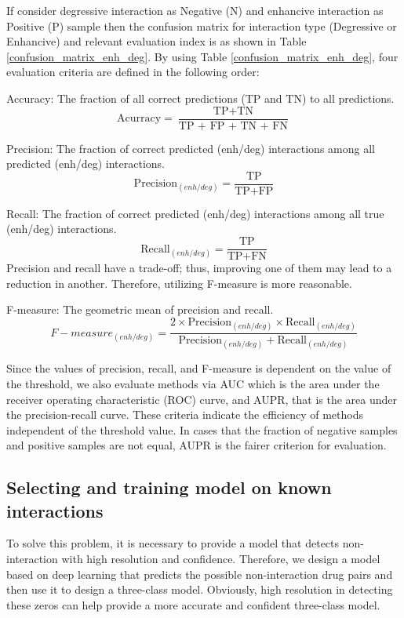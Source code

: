 \documentclass{bmcart}
\begin{document}
If consider degressive interaction as Negative (N) and enhancive interaction as Positive (P) sample then the confusion matrix for interaction type (Degressive or Enhancive) and relevant evaluation index is as shown in Table \ref{confusion_matrix_enh_deg}. By using Table \ref{confusion_matrix_enh_deg}, four evaluation criteria are defined in the following order:

Accuracy: The fraction of all correct predictions (TP and TN) to all predictions.
$$ \mbox{Acurracy} =  \frac{ \mbox{TP} + \mbox{TN}}{\mbox{TP + FP + TN + FN}} $$

Precision: The fraction of correct predicted (enh/deg) interactions among all predicted (enh/deg) interactions.
$$ \mbox{Precision}_{(enh/deg)} =  \frac{\mbox{TP}}{\mbox{TP} + \mbox{FP}} $$

Recall: The fraction of correct predicted (enh/deg) interactions among all true (enh/deg) interactions.
$$ \mbox{Recall}_{(enh/deg)} =  \frac{ \mbox{TP}}{\mbox{TP} + \mbox{FN}} $$
Precision and recall have a trade-off; thus, improving one of them may lead to a reduction in another. Therefore, utilizing F-measure is more reasonable.

F-measure: The geometric mean of precision and recall.
$$ F-measure_{(enh/deg)} = \frac{ 2\times \mbox{Precision}_{(enh/deg)} \times \mbox{Recall}_{(enh/deg)}}{\mbox{Precision}_{(enh/deg)} + \mbox{Recall}_{(enh/deg)}} $$

Since the values of precision, recall, and F-measure is dependent on the value of the threshold, we also evaluate methods via AUC which is the area under the receiver operating characteristic (ROC) curve, and AUPR, that is the area under the precision-recall curve. These criteria indicate the efficiency of methods independent of the threshold value. In cases that the fraction of negative samples and positive samples are not equal, AUPR is the fairer criterion for evaluation.

\subsection*{Selecting and training model on known interactions}
To solve this problem, it is necessary to provide a model that detects non-interaction with high resolution and confidence. Therefore, we design a model based on deep learning that predicts the possible non-interaction drug pairs and then use it to design a three-class model. Obviously, high resolution in detecting these zeros can help provide a more accurate and confident three-class model.
\end{document}
